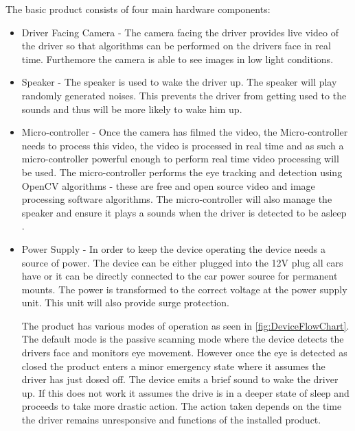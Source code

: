 The basic product consists of four main hardware components:
\begin{itemize}
  \item Driver Facing Camera - The camera facing the driver provides live video of the driver so that algorithms can be performed on the drivers face in real time. Furthemore the camera is able to see images in low light conditions.
  \item Speaker - The speaker is used to wake the driver up. The speaker will play randomly generated noises. This prevents the driver from getting used to the sounds and thus will be more likely to wake him up\cite{Habituation}.
  \item Micro-controller - Once the camera has filmed the video, the Micro-controller needs to process this video, the video is processed in real time and as such a micro-controller powerful enough to perform real time video processing will be used. The micro-controller performs the eye tracking and detection using OpenCV algorithms - these are free and open source video and image processing software algorithms. The micro-controller will also manage the speaker and ensure it plays a sounds when the driver is detected to be asleep \cite{OpenCV}.
  \item Power Supply - In order to keep the device operating the device needs a source of power. The device can be either plugged into the 12V plug all cars have or it can be directly connected to the car power source for permanent mounts. The power is transformed to the correct voltage at the power supply unit. This unit will also provide surge protection.
  
The product has various modes of operation as seen in \cref{fig:DeviceFlowChart}. The default mode is the passive scanning mode where the device detects the drivers face and monitors eye movement. However once the eye is detected as closed the product  enters a minor emergency state where it assumes the driver has just dosed off. The device emits a brief sound to wake the driver up. If this does not work it assumes the drive is in a deeper state of sleep and proceeds to take more drastic action. The action taken depends on the time the driver remains unresponsive and functions of the installed product.


\end{itemize}
